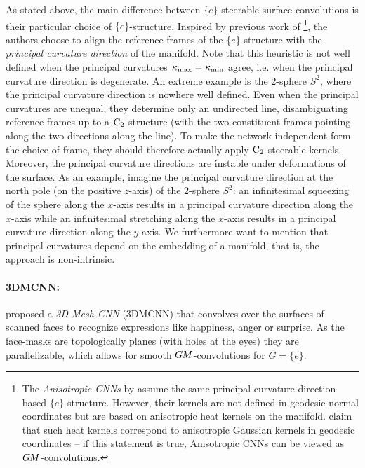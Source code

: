 As stated above, the main difference between $\{e\}$-steerable surface convolutions is their particular choice of $\{e\}$-structure.
Inspired by previous work of \citet{boscaini2016learning}%
\footnote{
    The \emph{Anisotropic CNNs} by \citet{boscaini2016learning} assume the same principal curvature direction based $\{e\}$-structure.
    However, their kernels are not defined in geodesic normal coordinates but are based on anisotropic heat kernels on the manifold.
    \citet{monti2017geometric} claim that such heat kernels correspond to anisotropic Gaussian kernels in geodesic coordinates -- if this statement is true, Anisotropic CNNs can be viewed as $G\mkern-1.4muM$-convolutions.
},
the authors choose to align the reference frames of the $\{e\}$-structure with the \emph{principal curvature direction} of the manifold.
Note that this heuristic is not well defined when the principal curvatures $\kappa_{\textup{max}} = \kappa_{\textup{min}}$ agree, i.e. when the principal curvature direction is degenerate.
An extreme example is the 2-sphere $S^2$, where the principal curvature direction is nowhere well defined.
Even when the principal curvatures are unequal, they determine only an undirected line, disambiguating reference frames up to a $\operatorname{C}_{2}$-structure (with the two constituent frames pointing along the two directions along the line).
To make the network independent form the choice of frame, they should therefore actually apply $\operatorname{C}_{2}$-steerable kernels.
Moreover, the principal curvature directions are instable under deformations of the surface.
As an example, imagine the principal curvature direction at the north pole (on the positive $z$-axis) of the 2-sphere $S^2$:
an infinitesimal squeezing of the sphere along the $x$-axis results in a principal curvature direction along the $x$-axis while an infinitesimal stretching along the $x$-axis results in a principal curvature direction along the $y$-axis.
We furthermore want to mention that principal curvatures depend on the embedding of a manifold, that is, the approach is non-intrinsic.





\paragraph{3DMCNN:}
\citet{jin2018learning} proposed a \emph{3D Mesh CNN} (3DMCNN) that convolves over the surfaces of scanned faces to recognize expressions like happiness, anger or surprise.
As the face-masks are topologically planes (with holes at the eyes) they are parallelizable, which allows for smooth $G\mkern-1.4muM$-convolutions for ${G=\{e\}}$.

